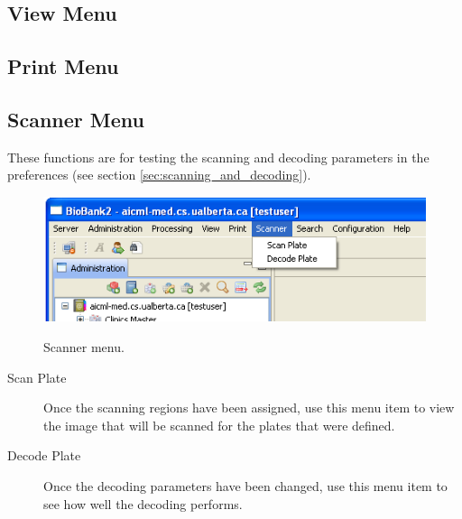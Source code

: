\subsection{View Menu}
\subsection{Print Menu}
\subsection{Scanner Menu}
These functions are for testing the scanning and decoding parameters in the
preferences (see section \ref{sec:scanning_and_decoding}).
    \begin{figure}[H]
      \centering
      \scalebox{0.5}
      { \includegraphics*{screenshots/overview/main_menu_scanner} }
      \caption{Scanner menu.}
      \label{fig:main_menu_scanner}
    \end{figure}
\begin{description}
  \item[Scan Plate] Once the scanning regions have been assigned, use this menu
    item to view the image that will be scanned for the plates that were
    defined.
  \item[Decode Plate] Once the decoding parameters have been changed, use this
    menu item to see how well the decoding performs.
\end{description}

